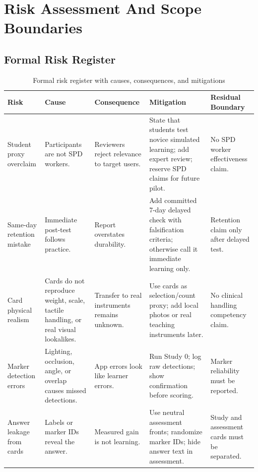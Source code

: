\documentclass[10pt,a4paper]{article}
\begin{document}

\section{Risk Assessment And Scope Boundaries}
\label{sec:risk-assessment-and-scope-boundaries}
\subsection{Formal Risk Register}

\begin{table}[H]
\centering
\caption{Formal risk register with causes, consequences, and mitigations}
\label{tab:formal-risk-register-with-causes-consequences-and-mitigations}
\small\renewcommand{\arraystretch}{1.15}\setlength{\tabcolsep}{3pt}
\begin{tabularx}{\textwidth}{|>{\raggedright\arraybackslash}p{2.2cm}|>{\raggedright\arraybackslash}X|>{\raggedright\arraybackslash}p{2.5cm}|>{\raggedright\arraybackslash}X|>{\raggedright\arraybackslash}p{2.3cm}|}
\hline
Risk & Cause & Consequence & Mitigation & Residual Boundary \\
\hline
Student proxy overclaim & Participants are not SPD workers. & Reviewers reject relevance to target users. & State that students test novice simulated learning; add expert review; reserve SPD claims for future pilot. & No SPD worker effectiveness claim. \\
\hline
Same-day retention mistake & Immediate post-test follows practice. & Report overstates durability. & Add committed 7-day delayed check with falsification criteria; otherwise call it immediate learning only. & Retention claim only after delayed test. \\
\hline
Card physical realism & Cards do not reproduce weight, scale, tactile handling, or real visual lookalikes. & Transfer to real instruments remains unknown. & Use cards as selection/count proxy; add local photos or real teaching instruments later. & No clinical handling competency claim. \\
\hline
Marker detection errors & Lighting, occlusion, angle, or overlap causes missed detections. & App errors look like learner errors. & Run Study 0; log raw detections; show confirmation before scoring. & Marker reliability must be reported. \\
\hline
Answer leakage from cards & Labels or marker IDs reveal the answer. & Measured gain is not learning. & Use neutral assessment fronts; randomize marker IDs; hide answer text in assessment. & Study and assessment cards must be separated. \\

\end{tabularx}
\end{table}
\end{document}
